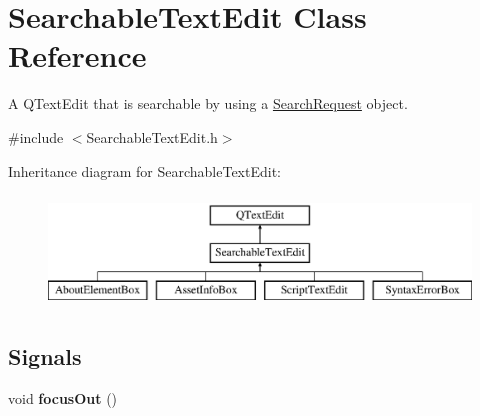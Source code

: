 \hypertarget{class_searchable_text_edit}{\section{Searchable\-Text\-Edit Class Reference}
\label{class_searchable_text_edit}
}


A Q\-Text\-Edit that is searchable by using a \hyperlink{struct_search_request}{Search\-Request} object.  




{\ttfamily \#include $<$Searchable\-Text\-Edit.\-h$>$}

Inheritance diagram for Searchable\-Text\-Edit\-:\begin{figure}[H]
\begin{center}
\leavevmode
\includegraphics[height=3.000000cm]{class_searchable_text_edit}
\end{center}
\end{figure}
\subsection*{Signals}
\begin{DoxyCompactItemize}
\item 
\hypertarget{class_searchable_text_edit_aea86b5ac923fb9a53e9b936d53279357}{void {\bfseries focus\-Out} ()}\label{class_searchable_text_edit_aea86b5ac923fb9a53e9b936d53279357}

\end{DoxyCompactItemize}
